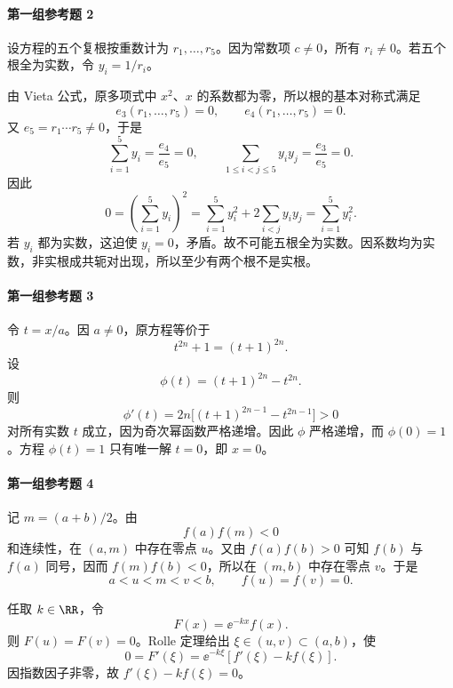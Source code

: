 \paragraph{第一组参考题 2}
\begin{xsolution}
设方程的五个复根按重数计为 $r_1,\ldots,r_5$。因为常数项 $c\neq0$，所有 $r_i\neq0$。若五个根全为实数，令 $y_i=1/r_i$。

由 Vieta 公式，原多项式中 $x^2$、$x$ 的系数都为零，所以根的基本对称式满足
\[
  e_3(r_1,\ldots,r_5)=0,
  \qquad
  e_4(r_1,\ldots,r_5)=0.
\]
又 $e_5=r_1\cdots r_5\neq0$，于是
\[
  \sum_{i=1}^5y_i=\frac{e_4}{e_5}=0,
  \qquad
  \sum_{1\leqslant i<j\leqslant5}y_iy_j=\frac{e_3}{e_5}=0.
\]
因此
\[
  0=\left(\sum_{i=1}^5y_i\right)^2
  =\sum_{i=1}^5y_i^2+2\sum_{i<j}y_iy_j
  =\sum_{i=1}^5y_i^2.
\]
若 $y_i$ 都为实数，这迫使 $y_i=0$，矛盾。故不可能五根全为实数。因系数均为实数，非实根成共轭对出现，所以至少有两个根不是实根。
\end{xsolution}

\paragraph{第一组参考题 3}
\begin{xsolution}
令 $t=x/a$。因 $a\neq0$，原方程等价于
\[
  t^{2n}+1=(t+1)^{2n}.
\]
设
\[
  \phi(t)=(t+1)^{2n}-t^{2n}.
\]
则
\[
  \phi'(t)=2n\bigl[(t+1)^{2n-1}-t^{2n-1}\bigr]>0
\]
对所有实数 $t$ 成立，因为奇次幂函数严格递增。因此 $\phi$ 严格递增，而 $\phi(0)=1$。方程 $\phi(t)=1$ 只有唯一解 $t=0$，即 $x=0$。
\end{xsolution}

\paragraph{第一组参考题 4}
\begin{xsolution}
记 $m=(a+b)/2$。由
\[
  f(a)f(m)<0
\]
和连续性，在 $(a,m)$ 中存在零点 $u$。又由 $f(a)f(b)>0$ 可知 $f(b)$ 与 $f(a)$ 同号，因而 $f(m)f(b)<0$，所以在 $(m,b)$ 中存在零点 $v$。于是
\[
  a<u<m<v<b,
  \qquad f(u)=f(v)=0.
\]

任取 $k\in\RR$，令
\[
  F(x)=\ee^{-kx}f(x).
\]
则 $F(u)=F(v)=0$。Rolle 定理给出 $\xi\in(u,v)\subset(a,b)$，使
\[
  0=F'(\xi)=\ee^{-k\xi}[f'(\xi)-kf(\xi)].
\]
因指数因子非零，故 $f'(\xi)-kf(\xi)=0$。
\end{xsolution}

